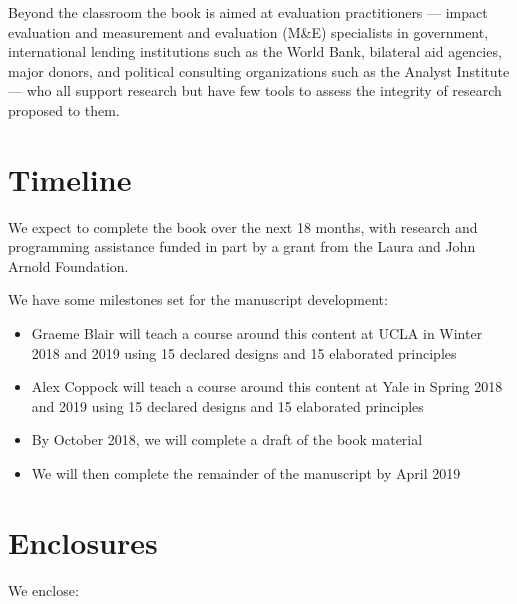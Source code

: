 \documentclass[11pt]{article}
\begin{document}
Beyond the classroom the book is aimed at evaluation practitioners --- impact evaluation and measurement and evaluation (M\&E) specialists in government, international lending institutions such as the World Bank, bilateral aid agencies, major donors, and political consulting organizations such as the Analyst Institute ---  who all support research but have few tools to assess the integrity of research proposed to them.


\section{Timeline}

We expect to complete the book over the next 18 months, with research and programming assistance funded in part by a grant from the Laura and John Arnold Foundation.

We have some milestones set for the manuscript development:

\begin{itemize}
\item 	Graeme Blair will teach a course around this content at UCLA in Winter 2018 and 2019 using 15 declared designs and 15 elaborated principles
\item 	Alex Coppock will teach a course around this content at Yale in Spring 2018 and 2019 using 15 declared designs and 15 elaborated principles
\item  By October 2018, we will complete a draft of the book material
\item We will then complete the remainder of the manuscript by April 2019
\end{itemize}

\section{Enclosures}

We enclose:
\end{document}
